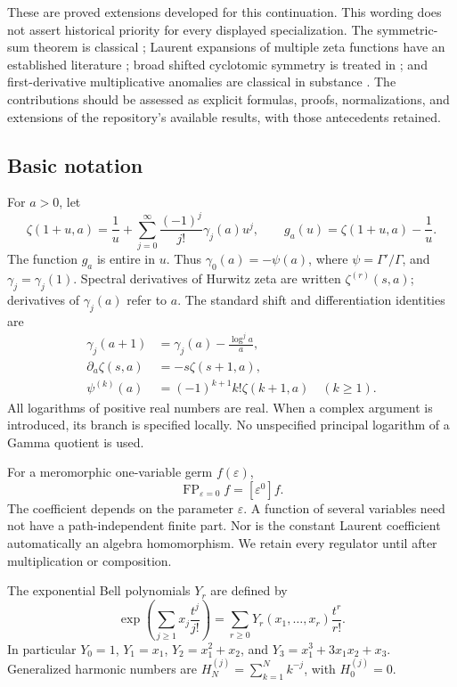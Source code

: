 \documentclass[11pt,letterpaper]{article}
\numberwithin{equation}{section}
\theoremstyle{plain}
\theoremstyle{definition}
\theoremstyle{remark}
\DeclareMathOperator{\FP}{FP}
\newcommand{\eps}{\varepsilon}
\newcommand{\laur}[1]{[\eps^{#1}]}
\begin{document}
These are proved extensions developed for this continuation. This wording
does not assert historical priority for every displayed specialization.
The symmetric-sum theorem is classical \cite{hoffman}; Laurent expansions
of multiple zeta functions have an established literature
\cite{mow,guozhang}; broad shifted cyclotomic symmetry is treated in
\cite{rui,xu}; and first-derivative multiplicative anomalies are classical
in substance \cite{dowker,gurel,mizuno}. The contributions should be
assessed as explicit formulas, proofs, normalizations, and extensions of
the repository's available results, with those antecedents retained.

\subsection{Basic notation}

For $a>0$, let
\begin{equation}\label{eq:stieltjes}
 \zeta(1+u,a)=\frac1u+
 \sum_{j=0}^{\infty}\frac{(-1)^j}{j!}\gamma_j(a)u^j,
 \qquad g_a(u)=\zeta(1+u,a)-\frac1u.
\end{equation}
The function $g_a$ is entire in $u$. Thus $\gamma_0(a)=-\psi(a)$,
where $\psi=\Gamma'/\Gamma$, and $\gamma_j=\gamma_j(1)$.
Spectral derivatives of Hurwitz zeta are written $\zeta^{(r)}(s,a)$;
derivatives of $\gamma_j(a)$ refer to $a$. The standard shift and
differentiation identities are \cite[\S25.11]{dlmf}
\begin{align}
 \gamma_j(a+1)&=\gamma_j(a)-\frac{\log^j a}{a},\label{eq:gshift}\\
 \partial_a\zeta(s,a)&=-s\zeta(s+1,a),\label{eq:zshiftder}\\
 \psi^{(k)}(a)&=(-1)^{k+1}k!\zeta(k+1,a)\quad(k\ge1).
\end{align}
All logarithms of positive real numbers are real. When a complex argument
is introduced, its branch is specified locally. No unspecified principal
logarithm of a Gamma quotient is used.

For a meromorphic one-variable germ $f(\eps)$,
\begin{equation}
 \FP_{\eps=0}f=\laur0f.
\end{equation}
The coefficient depends on the parameter $\eps$. A function of several
variables need not have a path-independent finite part. Nor is the
constant Laurent coefficient automatically an algebra homomorphism.
We retain every regulator until after multiplication or composition.

The exponential Bell polynomials $Y_r$ are defined by
\begin{equation}\label{eq:bell}
 \exp\left(\sum_{j\ge1}x_j\frac{t^j}{j!}\right)
 =\sum_{r\ge0}Y_r(x_1,\ldots,x_r)\frac{t^r}{r!}.
\end{equation}
In particular $Y_0=1$, $Y_1=x_1$, $Y_2=x_1^2+x_2$, and
$Y_3=x_1^3+3x_1x_2+x_3$. Generalized harmonic numbers are
$H_N^{(j)}=\sum_{k=1}^N k^{-j}$, with $H_0^{(j)}=0$.
\end{document}
